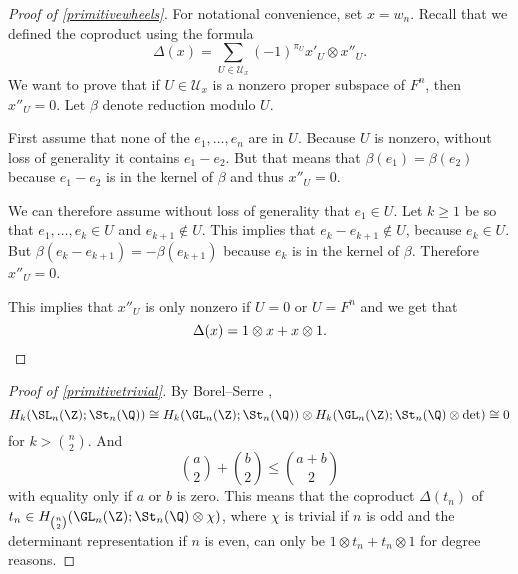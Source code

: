 \begin{proof}[Proof of \autoref{primitivewheels}]
For notational convenience, set $x=w_n$.
Recall that we defined the coproduct using the formula
\[ \Delta(x) = \sum_{U \in \mathcal U_{x}} (-1)^{\pi_{U}} x'_U \otimes x''_U.\]
We want to prove that if $U\in \mathcal U_x$ is a nonzero proper subspace of $F^n$, then $x''_U = 0$. Let $\beta$ denote reduction modulo $U$.

First assume that none of the $e_1, \dots, e_n$ are in $U$. Because $U$ is nonzero, without loss of generality  it contains  $e_1-e_2$. But that means that $\beta(e_1) = \beta(e_2)$ because $e_1-e_2$ is in the kernel of $\beta$ and thus $x''_U = 0$.

We can therefore assume without loss of generality that $e_1 \in U$. Let $k\ge 1$ be so that $e_1, \dots, e_k \in U$ and $e_{k+1} \not\in U$. This implies that $e_k-e_{k+1} \not\in U$, because $e_k \in U$. But $\beta(e_k- e_{k+1}) = -\beta(e_{k+1})$ because $e_k$ is in the kernel of $\beta$. Therefore $x''_U=0$.

This implies that $x''_U$ is only nonzero if $U=0$ or $U=F^n$ and we get that
\[ \Delta(x) = 1\otimes x + x\otimes 1.\qedhere\]
\end{proof}

\begin{proof}[Proof of \autoref{primitivetrivial}]
By Borel--Serre \cite{BoSe}, 
\[ H_k(\SL_n(\Z);\St_n(\Q)) \cong H_k(\GL_n(\Z); \St_n(\Q))\otimes H_k(\GL_n(\Z); \St_n(\Q) \otimes \det)\cong0\]
for $k>\binom n2$. And
\[ \binom a2 + \binom b2 \le \binom{a+b}2\]
with equality only if $a$ or $b$ is zero. This means that the coproduct $\Delta(t_n)$ of $t_n \in H_{\binom n2}(\GL_n(\Z);\St_n(\Q) \otimes \chi)$, where $\chi$ is trivial if $n$ is odd and the determinant representation if $n$ is even, can only be $1\otimes t_n + t_n \otimes 1$ for degree reasons.
\end{proof}





\vspace{.5cm}




 
